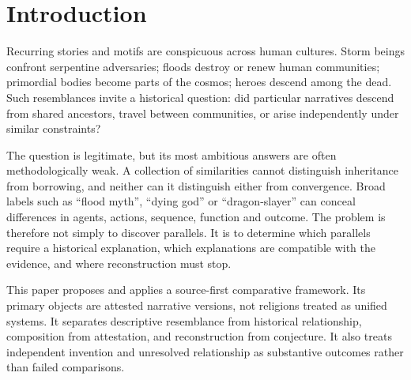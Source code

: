 \documentclass[11pt]{article}
\DeclareRobustCommand{\_}{\textunderscore\allowbreak}
\begin{document}
\begin{abstract}
defined answer on \(0.567\) of the single-valued cells it is applied to, and the
one prediction that separates M4 from a second null reverses on raw similarity
(\(-0.177\)) and ties once each dimension's base rate is subtracted
(\(-0.017\)) --- so the registered falsification hook is published as
scale-dependent instead of being read as a refutation of the model or of the
corpus. The further claim that no such being
exists remains outside the reach of any textual method, in either direction.
Global comparison is defensible as candidate discovery and falsification;
reconstruction must be restricted to elements supported by explicit historical
models, and 455 unit tests plus 7 parameterised subtests and the result
validators enforce those boundaries.

\medskip
\noindent\textbf{Keywords.} comparative mythology; narrative transmission;
common descent; independent invention; historical linguistics; phylogenetics;
provenance; source dependence; falsification; reproducible computational method.
\end{abstract}

\section{Introduction}

Recurring stories and motifs are conspicuous across human cultures. Storm beings
confront serpentine adversaries; floods destroy or renew human communities;
primordial bodies become parts of the cosmos; heroes descend among the dead.
Such resemblances invite a historical question: did particular narratives
descend from shared ancestors, travel between communities, or arise
independently under similar constraints?

The question is legitimate, but its most ambitious answers are often
methodologically weak. A collection of similarities cannot distinguish
inheritance from borrowing, and neither can it distinguish either from
convergence. Broad labels such as ``flood myth'', ``dying god'' or
``dragon-slayer'' can conceal differences in agents, actions, sequence, function
and outcome. The problem is therefore not simply to discover parallels. It is to
determine which parallels require a historical explanation, which explanations
are compatible with the evidence, and where reconstruction must stop.

This paper proposes and applies a source-first comparative framework. Its
primary objects are attested narrative versions, not religions treated as
unified systems. It separates descriptive resemblance from historical
relationship, composition from attestation, and reconstruction from conjecture.
It also treats independent invention and unresolved relationship as substantive
outcomes rather than failed comparisons.
\end{document}
